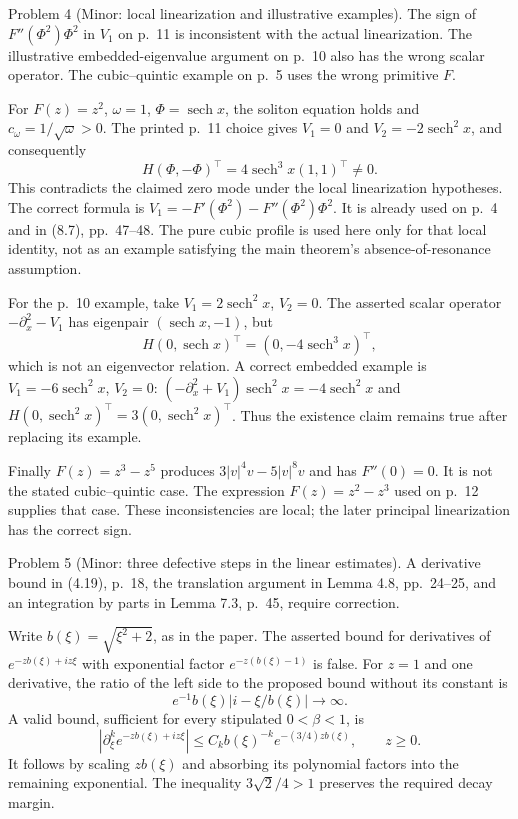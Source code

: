 \documentclass[10pt]{article}
\begin{document}
Problem 4 (Minor: local linearization and illustrative examples).  The sign of \(F''(\Phi^2)\Phi^2\) in \(V_1\) on p. 11 is inconsistent with the actual linearization. The illustrative embedded-eigenvalue argument on p. 10 also has the wrong scalar operator. The cubic–quintic example on p. 5 uses the wrong primitive \(F\).\par
For \(F(z)=z^2\), \(\omega=1\), \(\Phi=\mathop{\mathrm{sech}}x\), the soliton equation holds and \(c_\omega=1/\sqrt\omega>0\). The printed p. 11 choice gives \(V_1=0\) and \(V_2=-2\mathop{\mathrm{sech}}^2x\), and consequently \[H(\Phi,-\Phi)^\top=4\mathop{\mathrm{sech}}^3x(1,1)^\top\ne0.\] This contradicts the claimed zero mode under the local linearization hypotheses. The correct formula is \(V_1=-F'(\Phi^2)-F''(\Phi^2)\Phi^2\). It is already used on p. 4 and in (8.7), pp. 47–48. The pure cubic profile is used here only for that local identity, not as an example satisfying the main theorem’s absence-of-resonance assumption.\par
For the p. 10 example, take \(V_1=2\mathop{\mathrm{sech}}^2x\), \(V_2=0\). The asserted scalar operator \(-\partial_x^2-V_1\) has eigenpair \((\mathop{\mathrm{sech}}x,-1)\), but \[H(0,\mathop{\mathrm{sech}}x)^\top=(0,-4\mathop{\mathrm{sech}}^3x)^\top,\] which is not an eigenvector relation. A correct embedded example is \(V_1=-6\mathop{\mathrm{sech}}^2x\), \(V_2=0\): \((-\partial_x^2+V_1)\mathop{\mathrm{sech}}^2x=-4\mathop{\mathrm{sech}}^2x\) and \(H(0,\mathop{\mathrm{sech}}^2x)^\top=3(0,\mathop{\mathrm{sech}}^2x)^\top\). Thus the existence claim remains true after replacing its example.\par
Finally \(F(z)=z^3-z^5\) produces \(3|v|^4v-5|v|^8v\) and has \(F''(0)=0\). It is not the stated cubic–quintic case. The expression \(F(z)=z^2-z^3\) used on p. 12 supplies that case. These inconsistencies are local; the later principal linearization has the correct sign.\par
Problem 5 (Minor: three defective steps in the linear estimates).  A derivative bound in (4.19), p. 18, the translation argument in Lemma 4.8, pp. 24–25, and an integration by parts in Lemma 7.3, p. 45, require correction.\par
Write \(b(\xi)=\sqrt{\xi^2+2}\), as in the paper. The asserted bound for derivatives of \(e^{-zb(\xi)+iz\xi}\) with exponential factor \(e^{-z(b(\xi)-1)}\) is false. For \(z=1\) and one derivative, the ratio of the left side to the proposed bound without its constant is \[e^{-1}b(\xi)|i-\xi/b(\xi)|\longrightarrow\infty.\] A valid bound, sufficient for every stipulated \(0<\beta<1\), is \[|\partial_\xi^k e^{-zb(\xi)+iz\xi}|
 \le C_k b(\xi)^{-k}e^{-(3/4)zb(\xi)},\qquad z\ge0.\] It follows by scaling \(zb(\xi)\) and absorbing its polynomial factors into the remaining exponential. The inequality \(3\sqrt2/4>1\) preserves the required decay margin.\par
\end{document}
